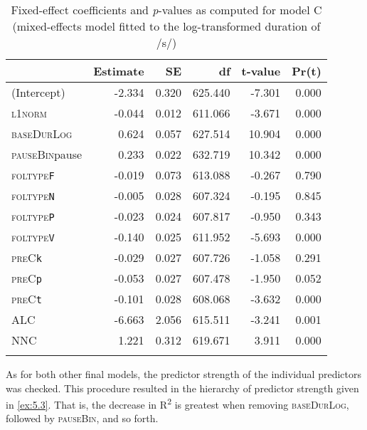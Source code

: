 \begin{table}\fontsize{10}{11}
\caption{Fixed-effect coefficients and \textit{p}-values as computed for model C (mixed-effects model fitted to the log-transformed duration of /s/)}
\label{tab:5.11}
\centering
\begin{tabular}{lrrrrr} 
\lsptoprule
~             & Estimate & SE    & df      & t-value & Pr(\textbar{}t\textbar{})  \\ 
\midrule
(Intercept)   & -2.334   & 0.320 & 625.440 & -7.301  & 0.000                      \\
\textsc{l1norm}        & -0.044   & 0.012 & 611.066 & -3.671  & 0.000                      \\
\textsc{baseDurLog}    & 0.624    & 0.057 & 627.514 & 10.904  & 0.000                      \\
\textsc{pauseBin}pause & 0.233    & 0.022 & 632.719 & 10.342  & 0.000                      \\
\textsc{foltype}\texttt{F}      & -0.019   & 0.073 & 613.088 & -0.267  & 0.790                      \\
\textsc{foltype}\texttt{N}      & -0.005   & 0.028 & 607.324 & -0.195  & 0.845                      \\
\textsc{foltype}\texttt{P}      & -0.023   & 0.024 & 607.817 & -0.950  & 0.343                      \\
\textsc{foltype}\texttt{V}      & -0.140   & 0.025 & 611.952 & -5.693  & 0.000                      \\
\textsc{preC}\texttt{k}         & -0.029   & 0.027 & 607.726 & -1.058  & 0.291                      \\
\textsc{preC}\texttt{p}         & -0.053   & 0.027 & 607.478 & -1.950  & 0.052                      \\
\textsc{preC}\texttt{t}         & -0.101   & 0.028 & 608.068 & -3.632  & 0.000                      \\
\textsc{ALC}           & -6.663   & 2.056 & 615.511 & -3.241  & 0.001                      \\
\textsc{NNC}           & 1.221    & 0.312 & 619.671 & 3.911   & 0.000                      \\
\lspbottomrule
\end{tabular}
\end{table}

As for both other final models, the predictor strength of the individual predictors was checked. This procedure resulted in the hierarchy of predictor strength given in \ref{ex:5.3}. That is, the decrease in R\textsuperscript{2} is greatest when removing \textsc{baseDurLog}, followed by \textsc{pauseBin}, and so forth. 

